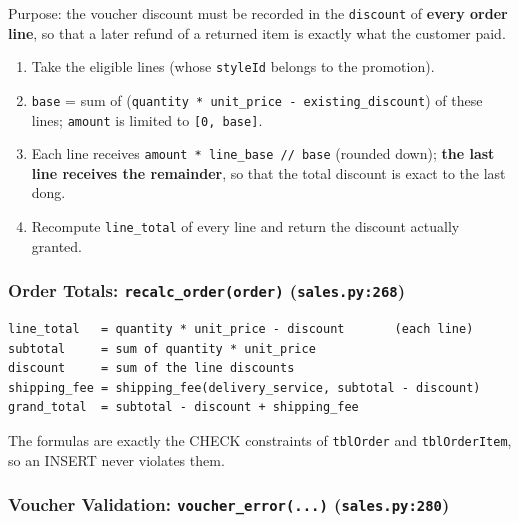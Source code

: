 Purpose: the voucher discount must be recorded in the \texttt{discount}
of \textbf{every order line}, so that a later refund of a returned item
is exactly what the customer paid.

\begin{enumerate}
\def\labelenumi{\arabic{enumi}.}
\tightlist
\item
  Take the eligible lines (whose \texttt{styleId} belongs to the
  promotion).
\item
  \texttt{base} = sum of
  (\texttt{quantity * unit\_\allowbreak{}price - existing\_\allowbreak{}discount}) of these
  lines; \texttt{amount} is limited to \texttt{{[}0,\allowbreak{} base{]}}.
\item
  Each line receives \texttt{amount * line\_\allowbreak{}base /\allowbreak{}/\allowbreak{} base} (rounded
  down); \textbf{the last line receives the remainder}, so that the
  total discount is exact to the last dong.
\item
  Recompute \texttt{line\_\allowbreak{}total} of every line and return the discount
  actually granted.
\end{enumerate}

\hypertarget{order-totals-recalc_orderorder-sales.py268}{%
\subsubsection{\texorpdfstring{Order Totals:
\texttt{recalc\_\allowbreak{}order(\allowbreak{}order)}
(\texttt{sales.\allowbreak{}py:268})}{Order Totals: recalc\_order(order) (sales.py:268)}}\label{order-totals-recalc_orderorder-sales.py268}}

\begin{lstlisting}[numbers=none]
line_total   = quantity * unit_price - discount       (each line)
subtotal     = sum of quantity * unit_price
discount     = sum of the line discounts
shipping_fee = shipping_fee(delivery_service, subtotal - discount)
grand_total  = subtotal - discount + shipping_fee
\end{lstlisting}

The formulas are exactly the CHECK constraints of \texttt{tblOrder} and
\texttt{tblOrderItem}, so an INSERT never violates them.

\hypertarget{voucher-validation-voucher_error...-sales.py280}{%
\subsubsection{\texorpdfstring{Voucher Validation:
\texttt{voucher\_\allowbreak{}error(\allowbreak{}.\allowbreak{}.\allowbreak{}.\allowbreak{})}
(\texttt{sales.\allowbreak{}py:280})}{Voucher Validation: voucher\_error(...) (sales.py:280)}}\label{voucher-validation-voucher_error...-sales.py280}}

